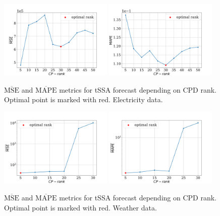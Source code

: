 \documentclass[referee, pdflatex]{sn-jnl}
\theoremstyle{definition}
\theoremstyle{plain}
\begin{document}
	\begin{figure}[h]
		\centering
		\includegraphics[width=0.48\textwidth, keepaspectratio]{../../experiments/electricity/tssa/figs/prediction/MSE_rank.png}
		\includegraphics[width=0.48\textwidth, keepaspectratio]{../../experiments/electricity/tssa/figs/prediction/MAPE_rank.png}
		\caption{$ \overline{\text{MSE}} $ and $ \overline{\text{MAPE}} $ metrics for tSSA forecast depending on CPD rank. Optimal point is marked with red. Electricity data.}\label{fig:mse_mape_electr}
	\end{figure}
	
	\begin{figure}[h]
		\centering
		\includegraphics[width=0.48\textwidth, keepaspectratio]{../../experiments/weather/tssa/figs/prediction/MSE_rank.png}
		\includegraphics[width=0.48\textwidth, keepaspectratio]{../../experiments/weather/tssa/figs/prediction/MAPE_rank.png}
		\caption{$ \overline{\text{MSE}} $ and $ \overline{\text{MAPE}} $ metrics for tSSA forecast depending on CPD rank. Optimal point is marked with red. Weather data.}\label{fig:mse_mape_weather}
	\end{figure}
	
\end{document}
